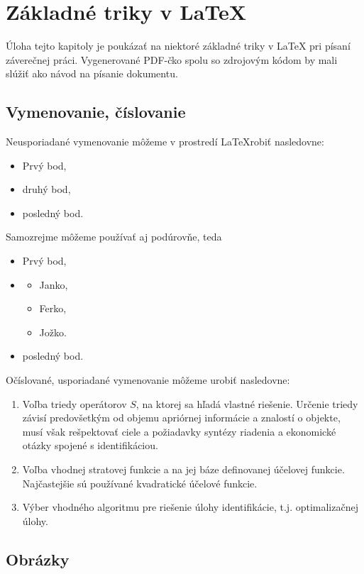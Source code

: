 \chapter{Základné triky v LaTeX}
\label{jablka}


Úloha tejto kapitoly je poukázať na niektoré základné triky v LaTeX pri písaní záverečnej práci. Vygenerované PDF-čko spolu so zdrojovým kódom by mali slúžiť ako návod na písanie dokumentu.


\section{Vymenovanie, číslovanie}

Neusporiadané vymenovanie môžeme v prostredí \LaTeX robiť nasledovne:
\begin{itemize}
\item Prvý bod,
\item druhý bod,
\item posledný bod.
\end{itemize}
Samozrejme môžeme používať aj podúrovňe, teda
\begin{itemize}
\item Prvý bod,
\item \begin{itemize}
\item Janko,
\item Ferko,
\item Jožko.
\end{itemize}
\item posledný bod.
\end{itemize}

Očíslované, usporiadané vymenovanie môžeme urobiť nasledovne:
\begin{enumerate}
  \item Voľba triedy operátorov $S$, na ktorej sa hľadá vlastné riešenie. Určenie triedy závisí predovšetkým od objemu apriórnej informácie a znalostí o objekte, musí však rešpektovať ciele a požiadavky syntézy riadenia a ekonomické otázky spojené s identifikáciou.
  \item Voľba vhodnej stratovej funkcie a na jej báze definovanej účelovej funkcie. Najčastejšie sú používané kvadratické účelové funkcie.
  \item Výber vhodného algoritmu pre riešenie úlohy identifikácie, t.j. optimalizačnej úlohy.
\end{enumerate}


\section{Obrázky}

